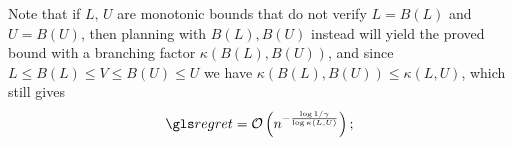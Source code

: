Note that if $L,\,U$ are monotonic bounds that do not verify $L = B(L)$ and $U=B(U)$, then planning with $B(L),B(U)$ instead will yield the proved bound with a branching factor $\kappa(B(L),B(U))$, and since $L\leq B(L)\leq V\leq B(U)\leq U$ we have $\kappa(B(L),B(U)) \leq \kappa(L,U)$, which still gives \begin{align*}
\regret = \cO\left(n^{-\frac{\log 1/\gamma}{\log \kappa(L,U)}}\right);
\end{align*}



%
%

